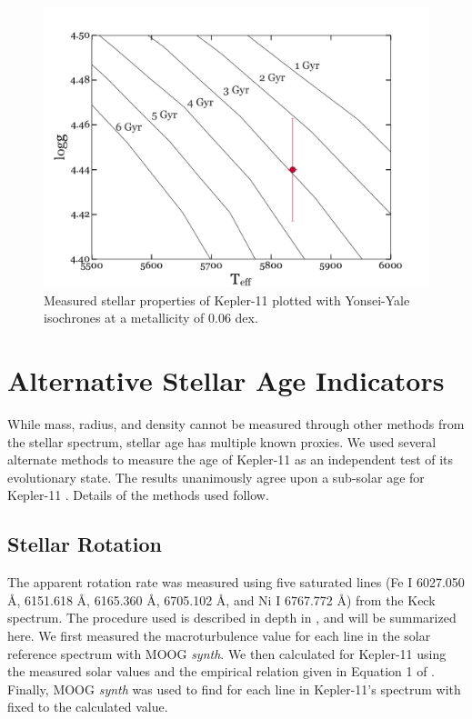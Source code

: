 \documentclass[oneside]{emulateapj}
\begin{document}
\begin{figure}
\centering
\includegraphics[width=\columnwidth]{isochrones}
\caption{Measured stellar properties of Kepler-11 plotted with Yonsei-Yale isochrones at a metallicity of 0.06 dex.}
\label{fig:isochrones}
\end{figure}

\section{Alternative Stellar Age Indicators}
\label{s:ages}

While mass, radius, and density cannot be measured through other methods from the stellar spectrum, stellar age has multiple known proxies. We used several alternate methods to measure the age of Kepler-11 as an independent test of its evolutionary state. The results unanimously agree upon a sub-solar age for Kepler-11 . Details of the methods used follow.

\subsection{Stellar Rotation}

The apparent rotation rate \vsini was measured using five saturated lines (Fe I 6027.050 \r{A}, 6151.618 \r{A}, 6165.360 \r{A}, 6705.102 \r{A}, and Ni I 6767.772 \r{A}) from the Keck spectrum. The procedure used is described in depth in \citet{dosSantos2016}, and will be summarized here. We first measured the macroturbulence value \vmacro for each line in the solar reference spectrum with MOOG \textit{synth}. We then calculated \vmacro for Kepler-11 using the measured solar values and the empirical relation given in Equation 1 of \citet{dosSantos2016}. Finally, MOOG \textit{synth} was used to find \vsini for each line in Kepler-11's spectrum with \vmacro fixed to the calculated value.
\end{document}
